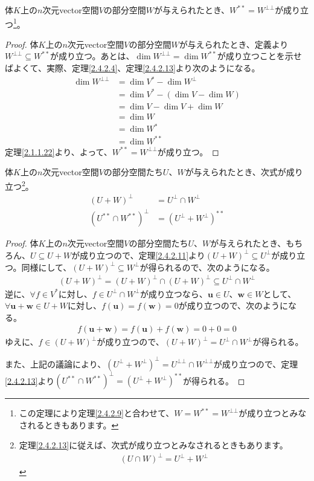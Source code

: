 \documentclass[dvipdfmx]{jsarticle}
\begin{document}
\begin{thm}\label{2.4.2.13}
体$K$上の$n$次元vector空間$V$の部分空間$W$が与えられたとき、$W^{**} = W^{\bot\bot}$が成り立つ\footnote{この定理により定理\ref{2.4.2.9}と合わせて、$W = W^{**} = W^{\bot\bot}$が成り立つとみなされるときもあります。}。
\end{thm}
\begin{proof}
体$K$上の$n$次元vector空間$V$の部分空間$W$が与えられたとき、定義より$W^{\bot\bot} \subseteq W^{**}$が成り立つ。あとは、$\dim W^{\bot\bot} = \dim W^{**}$が成り立つことを示せばよくて、実際、定理\ref{2.4.2.4}、定理\ref{2.4.2.13}より次のようになる。
\begin{align*}
\dim W^{\bot\bot} &= \dim V^{*} - \dim W^{\bot}\\
&= \dim V^{*} - \left( \dim V - \dim W \right)\\
&= \dim V - \dim V + \dim W\\
&= \dim W\\
&= \dim W^{*}\\
&= \dim W^{**}
\end{align*}
定理\ref{2.1.1.22}より、よって、$W^{**} = W^{\bot\bot}$が成り立つ。
\end{proof}
\begin{thm}\label{2.4.2.14}
体$K$上の$n$次元vector空間$V$の部分空間たち$U$、$W$が与えられたとき、次式が成り立つ\footnote{定理\ref{2.4.2.13}に従えば、次式が成り立つとみなされるときもあります。
\begin{align*}
(U \cap W)^{\bot} = U^{\bot} + W^{\bot}
\end{align*}}。
\begin{align*}
(U + W)^{\bot} &= U^{\bot} \cap W^{\bot}\\
\left( U^{**} \cap W^{**} \right)^{\bot} &= \left( U^{\bot} + W^{\bot} \right)^{**}
\end{align*}
\end{thm}
\begin{proof}
体$K$上の$n$次元vector空間$V$の部分空間たち$U$、$W$が与えられたとき、もちろん、$U \subseteq U + W$が成り立つので、定理\ref{2.4.2.11}より$(U + W)^{\bot} \subseteq U^{\bot}$が成り立つ。同様にして、$(U + W)^{\bot} \subseteq W^{\bot}$が得られるので、次のようになる。
\begin{align*}
(U + W)^{\bot} = (U + W)^{\bot} \cap (U + W)^{\bot} \subseteq U^{\bot} \cap W^{\bot}
\end{align*}
逆に、$\forall f \in V^{*}$に対し、$f \in U^{\bot} \cap W^{\bot}$が成り立つなら、$\mathbf{u} \in U$、$\mathbf{w} \in W$として、$\forall\mathbf{u} + \mathbf{w} \in U + W$に対し、$f\left( \mathbf{u} \right) = f\left( \mathbf{w} \right) = 0$が成り立つので、次のようになる。
\begin{align*}
f\left( \mathbf{u} + \mathbf{w} \right) = f\left( \mathbf{u} \right) + f\left( \mathbf{w} \right) = 0 + 0 = 0
\end{align*}
ゆえに、$f \in (U + W)^{\bot}$が成り立つので、$(U + W)^{\bot} = U^{\bot} \cap W^{\bot}$が得られる。\par
また、上記の議論により、$\left( U^{\bot} + W^{\bot} \right)^{\bot} = U^{\bot\bot} \cap W^{\bot\bot}$が成り立つので、定理\ref{2.4.2.13}より$\left( U^{**} \cap W^{**} \right)^{\bot} = \left( U^{\bot} + W^{\bot} \right)^{**}$が得られる。
\end{proof}
\end{document}
